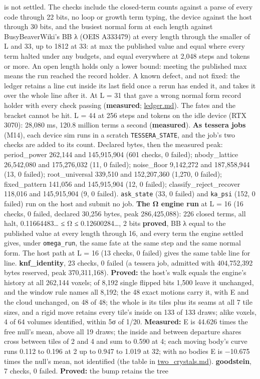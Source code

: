\begin{description}
is not settled. The checks include the closed-term counts against a parse of every code through 22 bits, no loop or growth term typing, the device against the host through 30 bits, and the busiest normal form at each length against BusyBeaverWiki's BB λ (OEIS A333479) at every length through the smaller of L and 33, up to 1812 at 33: at max the published value and equal where every term halted under any budgets, and equal everywhere at 2,048 steps and tokens or more. An open length holds only a lower bound: meeting the published max means the run reached the record holder. A known defect, and not fixed: the ledger retains a line cut inside its last field once a rerun has ended it, and takes it over the whole line after it. At L = 31 that gave a wrong normal form record holder with every check passing (\textbf{measured}; \hyperref[chap:ledger]{ledger.md}). The fates and the bracket cannot be hit. L = 44 at 256 steps and tokens on the idle device (RTX 3070): 28,080 ms, 120.8 million terms a second (\textbf{measured}). \textbf{As tessera jobs} (M14), each device sim runs in a scratch \texttt{TESSERA\_\allowbreak{}STATE}, and the job's two checks are added to its count. Declared bytes, then the measured peak: period\_\allowbreak{}power 262,144 and 145,915,904 (601 checks, 0 failed); nbody\_\allowbreak{}lattice 26,542,080 and 175,276,032 (11, 0 failed); noise\_\allowbreak{}floor 9,142,272 and 187,858,944 (13, 0 failed); root\_\allowbreak{}universal 339,510 and 152,207,360 (1,270, 0 failed); fixed\_\allowbreak{}pattern 141,056 and 145,915,904 (12, 0 failed); classify\_\allowbreak{}reject\_\allowbreak{}recover 118,016 and 145,915,904 (9, 0 failed). \texttt{ask\_\allowbreak{}state} (33, 0 failed) and \texttt{ka\_\allowbreak{}psi} (152, 0 failed) run on the host and submit no job. \textbf{The Ω engine run} at L = 16 (16 checks, 0 failed, declared 30,256 bytes, peak 286,425,088): 226 closed terms, all halt, 0.11664483… ≤ Ω ≤ 0.12600284…, 2 bits \textbf{proved}, BB λ equal to the published value at every length through 16, and every term the engine settled gives, under \texttt{omega\_\allowbreak{}run}, the same fate at the same step and the same normal form. The host path at L = 16 (13 checks, 0 failed) gives the same table line for line. \textbf{knf\_\allowbreak{}identity}, 23 checks, 0 failed (a tessera job, admitted with 404,752,392 bytes reserved, peak 370,311,168). \textbf{Proved:} the host's walk equals the engine's history at all 262,144 voxels; of 8,192 single flipped bits 1,500 leave it unchanged, and the window rule names all 8,192; the 48 exact motions carry it, with E and the cloud unchanged, on 48 of 48; the whole is its tiles plus its seams at all 7 tile sizes, and a rigid move retains every tile's inside on 133 of 133 draws; alike voxels, 4 of 64 volumes identified, within 5σ of 1/20. \textbf{Measured:} E is 44.626 times the free null's mean, above all 19 draws; the inside and between departure shares cross between tiles of 2 and 4 and sum to 0.590 at 4; each moving body's curve runs 0.112 to 0.196 at 2 up to 0.947 to 1.019 at 32; with no bodies E is −10.675 times the null's mean, not identified (the table in \hyperref[chap:two-crystals]{two\_\allowbreak{}crystals.md}). \textbf{goodstein}, 7 checks, 0 failed. \textbf{Proved:} the bump retains the tree 
\end{description}
